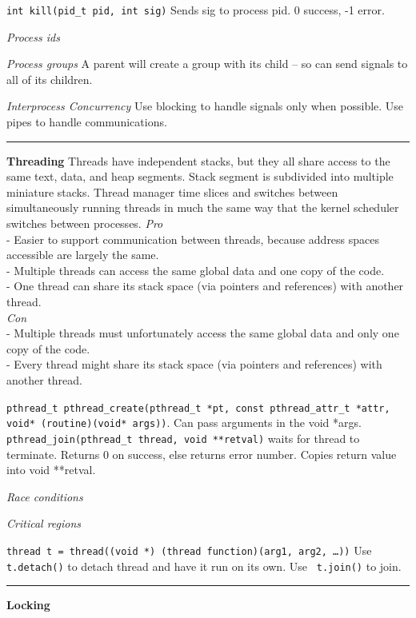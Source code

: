 \documentclass{article}
\begin{document}
\begin{multicols}{2}
  {\tt int kill(pid\_t pid, int sig)} Sends sig to process pid. 0 success, -1
  error.

  {\it Process ids} %

  {\it Process groups} A parent will create a group with its child -- so can
  send signals to all of its children.

  {\it Interprocess Concurrency} Use blocking to handle signals only when
  possible. Use pipes to handle communications.

  \noindent\rule{4cm}{0.4pt}

  {\bf Threading}
  Threads have independent stacks, but they all share access to the same text,
  data, and heap segments. Stack segment is subdivided into multiple miniature
  stacks. Thread manager time slices and switches between simultaneously running
  threads in much the same way that the kernel scheduler switches between
  processes.
  {\it Pro}\\
  - Easier to support communication between threads, because address spaces
  accessible are largely the same.\\
  - Multiple threads can access the same global data and one copy of the code.\\
  - One thread can share its stack space (via pointers and references) with
  another thread.\\
  {\it Con}\\
  - Multiple threads must unfortunately access the same global data and only one
  copy of the code.\\
  - Every thread might share its stack space (via pointers and references) with
  another thread.

  {\tt pthread\_t pthread\_create(pthread\_t *pt, const pthread\_attr\_t *attr,
  void* (routine)(void* args))}. Can pass arguments in the void *args.\\
  {\tt pthread\_join(pthread\_t thread, void **retval)} waits for thread to
  terminate. Returns 0 on success, else returns error number. Copies return
  value into void **retval.

  {\it Race conditions}

  {\it Critical regions}

  {\tt thread t = thread((void *) (thread function)(arg1, arg2, \ldots))} Use
  {\tt t.detach()} to detach thread and have it run on its own. Use {\tt
  t.join()} to join.

  \noindent\rule{4cm}{0.4pt}

  {\bf Locking}


\end{multicols}
\end{document}
